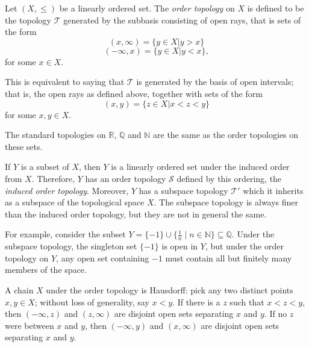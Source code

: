 \documentclass{article}
\begin{document}
Let $(X,\leq)$ be a linearly ordered set.  The \emph{order topology} on $X$ is defined to be the topology $\mathcal{T}$ generated by the subbasis consisting of open rays, that is sets of the form $$(x,\infty)=\{ y\in X|y>x\}$$ $$(-\infty,x)=\{ y\in X|y<x\},$$
for some $x\in X$.

This is equivalent to saying that $\mathcal{T}$ is generated by the basis of open intervals; that is, the open rays as defined above, together with sets of the form $$(x,y)=\{ z\in X|x<z<y\}$$ for some $x,y\in X$.

The standard topologies on $\mathbb{R}$, $\mathbb{Q}$ and $\mathbb{N}$ are the same as the order topologies on these sets.

If $Y$ is a subset of $X$, then $Y$ is a linearly ordered set under the induced order from $X$.  Therefore, $Y$ has an order topology $\mathcal{S}$ defined by this ordering, the \emph{induced order topology}.  Moreover, $Y$ has a subspace topology $\mathcal{T}'$ which it inherits as a subspace of the topological space $X$.  The subspace topology is always finer than the induced order topology, but they are not in general the same.

For example, consider the subset $Y=\{ -1\}\cup\{ \frac{1}{n} \mid n\in\mathbb{N}\}\subseteq\mathbb{Q}$.  Under the subspace topology, the singleton set $\{ -1\}$ is open in $Y$, but under the order topology on $Y$, 
any open set containing $-1$ must contain all but finitely many members of the space.

A chain $X$ under the order topology is Hausdorff: pick any two distinct points $x, y \in X$; without loss of generality, say $x < y$.    If there is a $z$ such that $x < z < y$, then $(-\infty,z)$ and $(z,\infty)$ are disjoint open sets separating $x$ and $y$.  If no $z$ were between $x$ and $y$, then $(-\infty,y)$ and $(x,\infty)$ are disjoint open sets separating $x$ and $y$.
\end{document}
